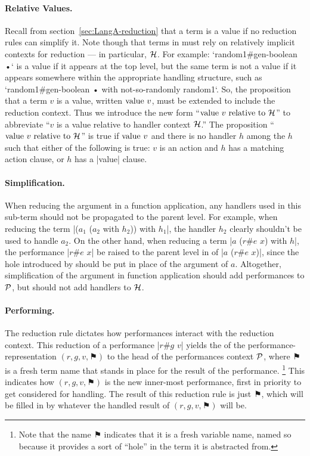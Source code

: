 \paragraph{Relative Values.}
Recall from section~\ref{sec:LangA-reduction} that a term is a value if no reduction rules can simplify it.
Note though that terms in \LangB must rely on relatively implicit contexts for reduction --- in particular, $\mathcal{H}$.
For example: \code`random1#gen-boolean •` is a value if it appears at the top level, but
the same term is not a value if it appears somewhere within the appropriate handling structure, such as \code`random1#gen-boolean • with not-so-randomly random1`.
So, the proposition that a term $v$ is a value, written $\mathrm{value}~v$, must be extended to include the reduction context.
Thus we introduce the new form ``$\mathrm{value}~v~\mathrm{relative~to}~\mathcal{H}$'' to abbreviate
``$v$ is a value relative to handler context $\mathcal{H}$.''
The proposition ``$\mathrm{value}~v~\mathrm{relative~to}~\mathcal{H}$'' is true if $\mathrm{value}~v$ and there is no handler $h$ among the $h$ such that either of the following is true:
$v$ is an action and $h$ has a matching action clause, or
$h$ has a \code|value| clause.

\paragraph{Simplification.}
When reducing the argument in a function application, any handlers used in this sub-term should not be propagated to the parent level.
For example, when reducing the term \code|($a_1$ ($a_2$ with $h_2$)) with $h_1$|, the handler $h_2$ clearly shouldn't be used to handle $a_2$.
On the other hand, when reducing a term \code|$a$ ($r$#$e$ $x$) with $h$|, the performance \code|$r$#$e$ $x$|  be raised to the parent level in of \code|$a$ ($r$#$e$ $x$)|, since the hole introduced by  should be put in place of the argument of $a$.
Altogether, simplification of the argument in function application should add performances to $\mathcal{P}$, but should not add handlers to $\mathcal{H}$.

\paragraph{Performing.}
The reduction rule  dictates how performances interact with the reduction context.
This reduction of a performance \code|$r$#$g$ $v$| yields the  of the performance-representation $(r,g,v,⚑)$ to the head of the performances context $\mathcal{P}$, where $⚑$ is a fresh term name that stands in place for the result of the performance.%
\footnote{
  Note that the name $⚑$ indicates that it is a fresh variable name, named so because it provides a sort of ``hole'' in the term it is abstracted from.
}
This indicates how $(r,g,v,⚑)$ is the new inner-most performance, first in priority to get considered for handling.
The result of this reduction rule is just $⚑$, which will be filled in by whatever the handled result of $(r,g,v,⚑)$ will be.


